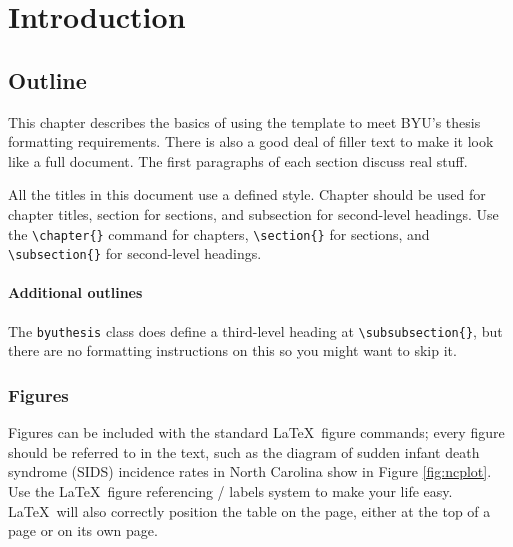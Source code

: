 \chapter{Introduction}


\section{Outline}

This chapter describes the basics of using the template to meet BYU's
thesis formatting requirements. There is also a good deal of filler text to
make it look like a full document. The first paragraphs of each section discuss
real stuff.

All the titles in this document use a defined style. Chapter should
be used for chapter titles, section for sections, and subsection for
second-level headings. Use the \verb+\chapter{}+ command for chapters,
\verb+\section{}+ for sections, and \verb+\subsection{}+ for second-level
headings.

\subsubsection{Additional outlines}

The \texttt{byuthesis} class does define a third-level heading
at \verb+\subsubsection{}+, but there are no formatting instructions on this so
you might want to skip it.


\lipsum[1]

\subsection{Figures}

Figures
can be included with the standard \LaTeX \ figure commands; every figure should
be referred to in the text, such as the diagram of sudden infant death
syndrome (SIDS) incidence rates in North Carolina show in Figure \ref{fig:ncplot}.
Use the \LaTeX \ figure referencing / labels system to make your life easy.
\LaTeX \ will also correctly position the table on the page, either at the
top of a page or on its own page.

